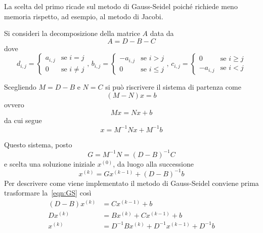 La scelta del primo ricade sul metodo di Gauss-Seidel poiché richiede meno memoria rispetto, ad esempio, al metodo di Jacobi.

Si consideri la decomposizione della matrice $A$ data da
\begin{equation*}
A = D - B - C
\end{equation*}
dove
\begin{equation*}
d_{i,j} =  
\begin{cases}
a_{i,j} & \text{se } i = j\\
0 & \text{se } i \ne j
\end{cases},\,
b_{i,j} =
\begin{cases}
-a_{i,j} & \text{se } i > j\\
0 & \text{se }i \leq j
\end{cases},\,
c_{i,j} =
\begin{cases}
0 & \text{se } i \geq j\\
-a_{i,j} & \text{se } i < j
\end{cases}\end{equation*}

Scegliendo $M = D - B$ e $N = C$ si può riscrivere il sistema di partenza come 
\begin{equation*}
(M- N)x = b
\end{equation*}
ovvero
\begin{equation*}
Mx = Nx + b
\end{equation*}
da cui segue
\begin{equation*}
x = M^{-1}Nx+M^{-1}b
\end{equation*}  

Questo sistema, posto
\begin{equation*}
G = M^{-1}N = (D-B)^{-1}C
\end{equation*}
e scelta una soluzione iniziale $x^{(0)}$, da luogo alla successione
\begin{equation}
\label{eqn:GS}
x^{(k)} = Gx^{(k-1)}+(D-B)^{-1}b
\end{equation}
Per descrivere come viene implementato il metodo di Gauss-Seidel conviene prima trasformare la~\eqref{eqn:GS} così
\begin{equation*}
\begin{split}
(D-B)x^{(k)} &= Cx^{(k-1)} + b\\
Dx^{(k)} &= Bx^{(k)} + Cx^{(k-1)} + b\\
x^{(k)} &= D^{-1}Bx^{(k)}+D^{-1}x^{(k-1)} + D^{-1}b
\end{split}
\end{equation*}

